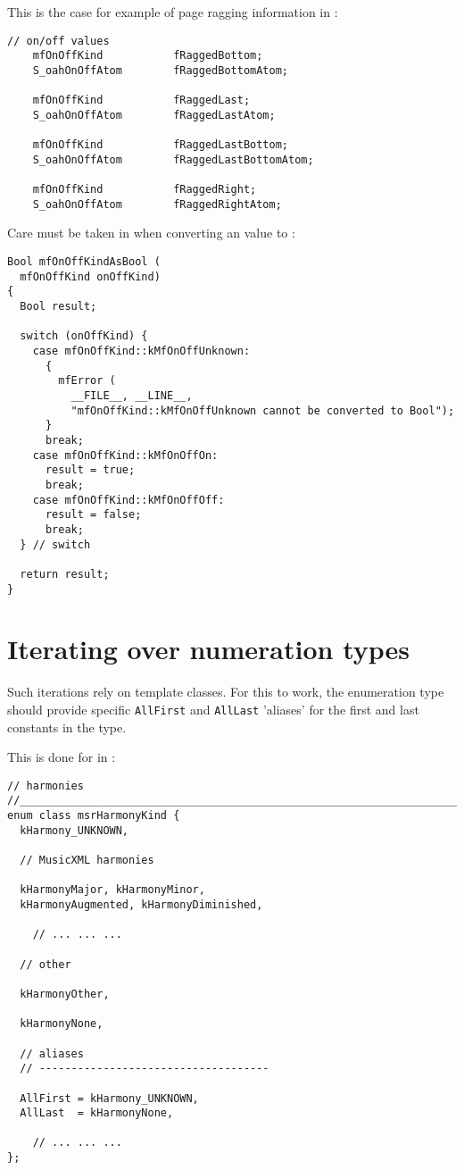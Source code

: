 This is the case for example of page ragging information in :
\begin{lstlisting}[language=Terminal]
    // on/off values
    mfOnOffKind           fRaggedBottom;
    S_oahOnOffAtom        fRaggedBottomAtom;

    mfOnOffKind           fRaggedLast;
    S_oahOnOffAtom        fRaggedLastAtom;

    mfOnOffKind           fRaggedLastBottom;
    S_oahOnOffAtom        fRaggedLastBottomAtom;

    mfOnOffKind           fRaggedRight;
    S_oahOnOffAtom        fRaggedRightAtom;
\end{lstlisting}

Care must be taken in  when converting an  value to :
\begin{lstlisting}[language=Terminal]
Bool mfOnOffKindAsBool (
  mfOnOffKind onOffKind)
{
  Bool result;

  switch (onOffKind) {
    case mfOnOffKind::kMfOnOffUnknown:
      {
        mfError (
          __FILE__, __LINE__,
          "mfOnOffKind::kMfOnOffUnknown cannot be converted to Bool");
      }
      break;
    case mfOnOffKind::kMfOnOffOn:
      result = true;
      break;
    case mfOnOffKind::kMfOnOffOff:
      result = false;
      break;
  } // switch

  return result;
}
\end{lstlisting}


\section{Iterating over numeration types}

Such iterations rely on template classes. For this to work, the enumeration type should provide specific {\tt AllFirst} and {\tt AllLast} 'aliases' for the first and last constants in the type.

This is done for  in :
\begin{lstlisting}[language=CPlusPlus]
// harmonies
//______________________________________________________________________________
enum class msrHarmonyKind {
  kHarmony_UNKNOWN,

  // MusicXML harmonies

  kHarmonyMajor, kHarmonyMinor,
  kHarmonyAugmented, kHarmonyDiminished,

	// ... ... ...

  // other

  kHarmonyOther,

  kHarmonyNone,

  // aliases
  // ------------------------------------

  AllFirst = kHarmony_UNKNOWN,
  AllLast  = kHarmonyNone,

	// ... ... ...
};
\end{lstlisting}

